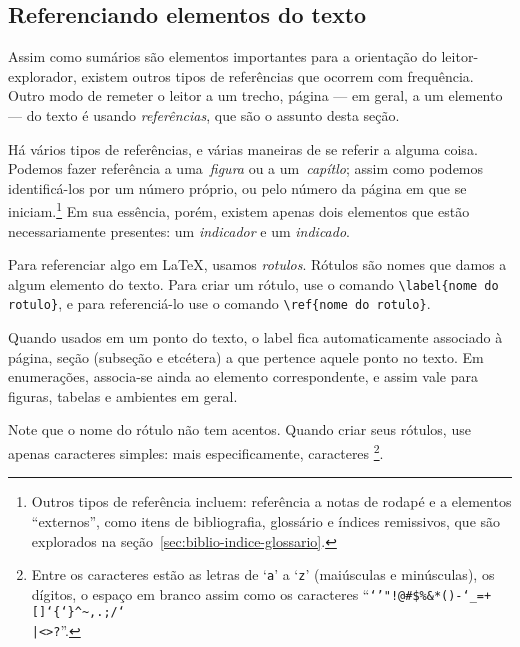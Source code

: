 \subsection{Referenciando elementos do texto}

Assim como sumários são elementos importantes para a orientação do leitor-explorador, existem outros tipos de referências que ocorrem com frequência. Outro modo de remeter o leitor a um trecho, página --- em geral, a um elemento --- do texto é usando \emph{referências}, que são o assunto desta seção.

Há vários tipos de referências, e várias maneiras de se referir a alguma coisa. Podemos fazer referência a uma~\emph{figura} ou a um~\emph{capítlo}; assim como podemos identificá-los por um número próprio, ou pelo número da página em que se iniciam.\footnote{Outros tipos de referência incluem: referência a notas de rodapé e a elementos ``externos'', como itens de bibliografia, glossário e índices remissivos, que são explorados na seção~\ref{sec:biblio-indice-glossario}.} Em sua essência, porém, existem apenas dois elementos que estão necessariamente presentes: um \emph{indicador} e um \emph{indicado}.

Para referenciar algo em \LaTeX, usamos \emph{rotulos}. Rótulos são nomes que damos a algum elemento do texto. Para criar um rótulo, use o comando \verb'\label{nome do rotulo}', e para referenciá-lo use o comando \verb'\ref{nome do rotulo}'. 

Quando usados em um ponto do texto, o label fica automaticamente associado à página, seção (subseção e etcétera) a que pertence aquele ponto no texto. Em enumerações, associa-se ainda ao elemento correspondente, e assim vale para figuras, tabelas e ambientes em geral.

Note que o nome do rótulo não tem acentos. Quando criar seus rótulos, use apenas caracteres simples: mais especificamente, caracteres  \footnote{Entre os caracteres  estão as letras de `\texttt{a}' a `\texttt{z}' (maiúsculas e minúsculas), os dígitos, o espaço em branco assim como os caracteres ``\texttt{`'"!@\#\$\%\&*()-\char`\_=+[]\char`\{\char`\}\^{}\~{},.;/\char`\\|<>?}''.}.

